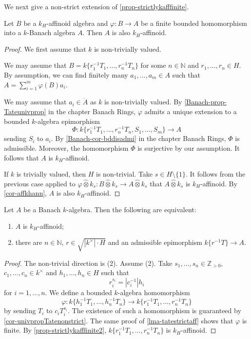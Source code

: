 We next give a non-strict extension of \cref{prop-strictlykafffinite}.
\begin{proposition}\label{prop-strictlykafffinite2}
    Let $B$ be a $k_H$-affinoid algebra and $\varphi:B\rightarrow A$ be a finite bounded homomorphism into a $k$-Banach algebra $A$. Then $A$ is also $k_H$-affinoid.
\end{proposition}
\begin{proof}
    We first assume that $k$ is non-trivially valued.

    We may assume that $B=k\{r_1^{-1}T_1,\ldots,r_n^{-1}T_n\}$ for some $n\in \mathbb{N}$ and $r_1,\ldots,r_n\in H$.
    By assumption, we can find finitely many $a_1,\ldots,a_m\in A$ such that $A=\sum_{i=1}^m \varphi(B)a_i$.

    We may assume that $a_i\in \mathring{A}$ as $k$ is non-trivially valued. By \cref{Banach-prop-Tateunivprop} in the chapter Banach Rings, $\varphi$ admits a unique extension to a bounded $k$-algebra epimorphism 
    \[
        \Phi:  k\{r_1^{-1}T_1,\ldots,r_n^{-1}T_n,S_1,\ldots,S_m\}\rightarrow A
    \]
    sending $S_i$ to $a_i$. By \cref{Banach-cor-bddisadmi} in the chapter Banach Rings, $\Phi$ is admissible. Moreover, the homomorphism $\Phi$ is surjective by our assumption. It follows that $A$ is $k_H$-affinoid.

    If $k$ is trivially valued, then $H$ is non-trivial.
    Take $s\in H \setminus \{1\}$. It follows from the previous case applied to  $\varphi\hat{\otimes}k_s:B \hat{\otimes}k_s\rightarrow A \hat{\otimes}k_s$ that $A \hat{\otimes}k_s$ is $k_H$-affinoid. By \cref{cor-affkhann}, $A$ is also $k_H$-affinoid. 
\end{proof}


\begin{proposition}\label{prop-affkhchar1}
    Let $A$ be a Banach $k$-algebra. Then the following are equivalent:
    \begin{enumerate}
        \item $A$ is $k_H$-affinoid;
        \item there are $n\in \mathbb{N}$, $r\in \sqrt{|k^{\times}|\cdot H}$ and an admissible epimorphism $k\{r^{-1}T\}\rightarrow A$.
    \end{enumerate}
\end{proposition}
\begin{proof}
    The non-trivial direction is (2). Assume (2).
    Take $s_1,\ldots,s_n\in \mathbb{Z}_{>0}$, $c_1,\ldots,c_n\in k^{\times}$ and $h_1,\ldots,h_n\in H$ such that
    \[
        r_i^{s_i}=|c_i^{-1}|h_i  
    \]
    for $i=1,\ldots,n$. We define a bounded $k$-algebra homomorphism
    \[
        \varphi:k\{h_1^{-1}T_1,\ldots,h_n^{-1}T_n\}\rightarrow k\{r_1^{-1}T_1,\ldots,r_n^{-1}T_n\}  
    \]
    by sending $T_i$ to $c_i T_i^{s_i}$. The existence of such a homomorphism is guaranteed by \cref{cor-univpropTatenonstrict}. The same proof of \cref{lma-tatestrictaff} shows that $\varphi$ is finite. By \cref{prop-strictlykafffinite2}, $k\{r_1^{-1}T_1,\ldots,r_n^{-1}T_n\}  $ is $k_H$-affinoid.
\end{proof}


